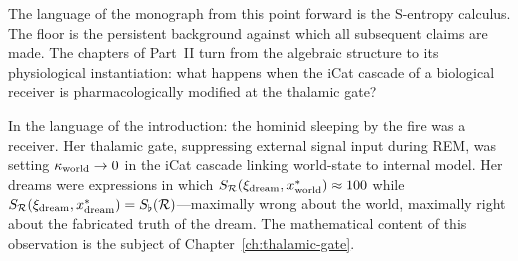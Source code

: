 The language of the monograph from this point forward is the S-entropy calculus. The floor is the persistent background against which all subsequent claims are made. The chapters of Part~II turn from the algebraic structure to its physiological instantiation: what happens when the iCat cascade of a biological receiver is pharmacologically modified at the thalamic gate?

\medskip
In the language of the introduction: the hominid sleeping by the fire was a receiver. Her thalamic gate, suppressing external signal input during REM, was setting $\kappa_{\mathrm{world}} \to 0$ in the iCat cascade linking world-state to internal model. Her dreams were expressions in which $S_{\mathcal{R}}(\xi_{\mathrm{dream}}, x^*_{\mathrm{world}}) \approx 100$ while $S_{\mathcal{R}}(\xi_{\mathrm{dream}}, x^*_{\mathrm{dream}}) = S_{\flat}(\mathcal{R})$---maximally wrong about the world, maximally right about the fabricated truth of the dream. The mathematical content of this observation is the subject of Chapter~\ref{ch:thalamic-gate}.
